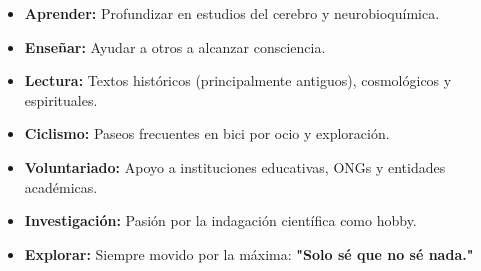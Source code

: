 
\begin{itemize}
    \item \textbf{Aprender:} Profundizar en estudios del cerebro y neurobioquímica.
    \item \textbf{Enseñar:} Ayudar a otros a alcanzar consciencia.
    \item \textbf{Lectura:} Textos históricos (principalmente antiguos), cosmológicos y espirituales.
    \item \textbf{Ciclismo:} Paseos frecuentes en bici por ocio y exploración.
    \item \textbf{Voluntariado:} Apoyo a instituciones educativas, ONGs y entidades académicas.
    \item \textbf{Investigación:} Pasión por la indagación científica como hobby.
    \item \textbf{Explorar:} Siempre movido por la máxima: \textbf{"Solo sé que no sé nada."}
\end{itemize}
